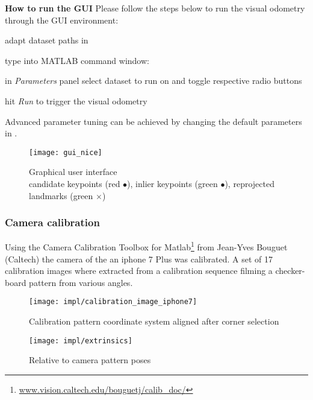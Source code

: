 \textbf{How to run the GUI}
Please follow the steps below to run the visual odometry through the GUI environment:
\begin{compactenum}
	\item adapt dataset paths in 
	\item type into MATLAB command window: 
	\item in \textit{Parameters} panel select dataset to run on and toggle respective radio buttons
	\item hit \textit{Run} to trigger the visual odometry\\
\end{compactenum}

Advanced parameter tuning can be achieved by changing the default parameters in .

\begin{figure}[ht]
	\centering
	\texttt{[image: gui\_nice]}
	\captionsetup{justification=centering}
	\caption{Graphical user interface \\candidate keypoints (red $\bullet$), inlier keypoints (green $\bullet$), reprojected landmarks (green $\times$)}
	\label{img_gui}
\end{figure}


\subsubsection{Camera calibration}
Using the Camera Calibration Toolbox for Matlab\footnote{\url{www.vision.caltech.edu/bouguetj/calib_doc/}} from Jean-Yves Bouguet (Caltech) the camera of the an iphone 7 Plus was calibrated. A set of 17 calibration images where extracted from a calibration sequence filming a checker-board pattern from various angles.

\begin{figure}[htbp]
	\centering
	\begin{minipage}{0.4\textwidth} 
		\centering
		\texttt{[image: impl/calibration\_image\_iphone7]}
		\caption{Calibration pattern coordinate system aligned after corner selection}
		\label{img_calib}
	\end{minipage}
	\begin{minipage}{0.4\textwidth}
		\centering
		\texttt{[image: impl/extrinsics]}
		\caption{Relative to camera pattern poses}
		\label{img_calib} 
	\end{minipage}
\end{figure}


